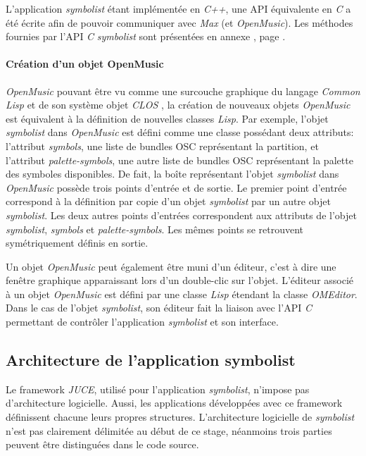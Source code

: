L'application \textit{symbolist} étant implémentée en \textit{C++}, une API équivalente en \textit{C} a été écrite afin de pouvoir communiquer avec \textit{Max} (et \textit{OpenMusic}).
Les méthodes fournies par l'API \textit{C} \textit{symbolist} sont présentées en annexe , page .

\paragraph{Création d'un objet OpenMusic} \textit{OpenMusic} pouvant être vu comme une surcouche graphique du langage \textit{Common Lisp} et de son système objet \textit{CLOS} \cite{bresson2009}, la création de nouveaux objets \textit{OpenMusic} est équivalent à la définition de nouvelles classes \textit{Lisp}.
Par exemple, l'objet \textit{symbolist} dans \textit{OpenMusic} est défini comme une classe possédant deux attributs: l'attribut \textit{symbols}, une liste de bundles OSC représentant la partition, et l'attribut \textit{palette-symbols}, une autre liste de bundles OSC représentant la palette des symboles disponibles.  
De fait, la boîte représentant l'objet \textit{symbolist} dans \textit{OpenMusic} possède trois points d'entrée et de sortie. Le premier point d'entrée correspond à la définition par copie d'un objet \textit{symbolist} par un autre objet \textit{symbolist}. Les deux autres points d'entrées correspondent aux attributs de l'objet \textit{symbolist}, \textit{symbols} et \textit{palette-symbols}.
Les mêmes points se retrouvent symétriquement définis en sortie.

Un objet \textit{OpenMusic} peut également être muni d'un éditeur, c'est à dire une fenêtre graphique apparaissant lors d'un double-clic sur l'objet. L'éditeur associé à un objet \textit{OpenMusic} est défini par une classe \textit{Lisp} étendant la classe \textit{OMEditor}. 
Dans le cas de l'objet \textit{symbolist}, son éditeur fait la liaison avec l'API \textit{C} permettant de contrôler l'application \textit{symbolist} et son interface.
 
\subsection{Architecture de l'application symbolist}
\label{subsec:architectureBefore}
Le framework \textit{JUCE}, utilisé pour l'application \textit{symbolist}, n'impose pas d'architecture logicielle. Aussi, les applications développées avec ce framework définissent chacune leurs propres structures.
L'architecture logicielle de \textit{symbolist} n'est pas clairement délimitée au début de ce stage, néanmoins trois parties peuvent être distinguées dans le code source. 

